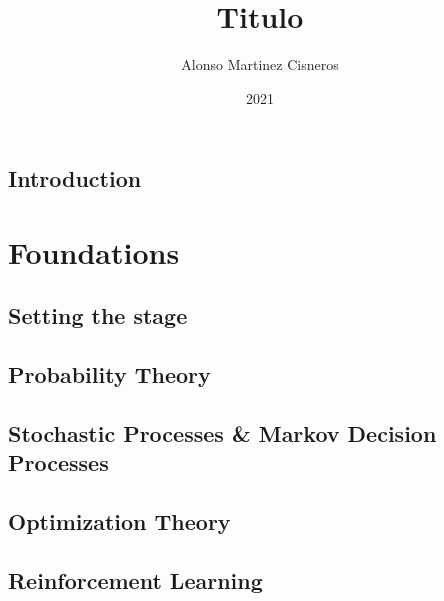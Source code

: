 \documentclass[colorful]{sty/itam-thesis}
\author{Alonso Martinez Cisneros}
\title{Titulo}
\date{2021}
\begin{document}
\frontmatter
\maketitle
\makefrontmatter

\cleardoublepage
\pagestyle{plain}






\tableofcontents

\mainmatter


% 
\chapter*{Introduction}


\part{Foundations}

\chapter{Setting the stage}



\chapter{Probability Theory}
\chapter{Stochastic Processes \& Markov Decision Processes}
\chapter{Optimization Theory}
\chapter{Reinforcement Learning}

\nocite{*}
\printbibliography
\end{document}
